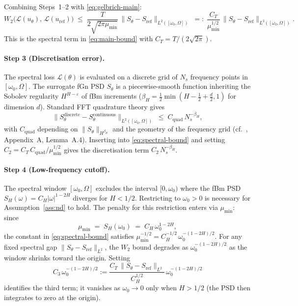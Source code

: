 \documentclass[11pt,a4paper]{article}
\begin{document}
Combining Steps~1--2 with \eqref{eq:gelbrich-main}:
\begin{equation}\label{eq:spectral-bound}
 W_2\!\bigl(\mathcal{L}(u_\theta),\,\mathcal{L}(u_{\mathrm{ref}})\bigr)
 \;\leq\;
 \frac{T}{2\sqrt{2\pi\mu_{\min}}}\,
 \bigl\|S_\theta - S_{\mathrm{ref}}\bigr\|_{L^2([\omega_0,\Omega])}
 \;=:\;
 \frac{C_T}{\mu_{\min}^{1/2}}\,
 \bigl\|S_\theta - S_{\mathrm{ref}}\bigr\|_{L^2([\omega_0,\Omega])}.
\end{equation}
This is the spectral term in \eqref{eq:main-bound} with $C_T = T/(2\sqrt{2\pi})$.

\paragraph{Step 3 (Discretisation error).}
The spectral loss $\mathcal{L}(\theta)$ is evaluated on a discrete grid of
$N_s$ frequency points in $[\omega_0,\Omega]$. The surrogate fGn PSD
$S_\theta$ is a piecewise-smooth function inheriting the Sobolev
regularity $H^{H-\varepsilon}$ of fBm increments ($\beta_H =
\tfrac{1}{2}\min(H-\tfrac{1}{2}+\tfrac{d}{2},1)$ for dimension $d$).
Standard FFT quadrature theory gives
\[
 \bigl\|S_\theta^{\mathrm{discrete}} - S_\theta^{\mathrm{continuous}}
 \bigr\|_{L^2([\omega_0,\Omega])}
 \;\leq\; C_{\mathrm{quad}}\,N_s^{-\beta_H},
\]
with $C_{\mathrm{quad}}$ depending on $\|S_\theta\|_{H^{\beta_H}}$
and the geometry of the frequency grid
(cf.\ \citet{TODO-paper1}, Appendix~A, Lemma~A.4).
Inserting into \eqref{eq:spectral-bound} and setting
$C_2 = C_T\,C_{\mathrm{quad}}/\mu_{\min}^{1/2}$ gives the
discretisation term $C_2\,N_s^{-\beta_H}$.

\paragraph{Step 4 (Low-frequency cutoff).}
The spectral window $[\omega_0,\Omega]$ excludes the interval $[0,\omega_0)$
where the fBm PSD $S_H(\omega) = C_H|\omega|^{1-2H}$ diverges for $H < 1/2$.
Restricting to $\omega_0 > 0$ is necessary for Assumption~\ref{ass:nd} to
hold. The penalty for this restriction enters via $\mu_{\min}$: since
\[
 \mu_{\min} \;=\; S_H(\omega_0) \;=\; C_H\,\omega_0^{1-2H},
\]
the constant in \eqref{eq:spectral-bound} satisfies
$\mu_{\min}^{-1/2} = C_H^{-1/2}\,\omega_0^{-(1-2H)/2}$.
For any fixed spectral gap $\|S_\theta-S_{\mathrm{ref}}\|_{L^2}$, the
$W_2$ bound degrades as $\omega_0^{-(1-2H)/2}$ as the window shrinks toward
the origin. Setting
\[
 C_3\,\omega_0^{-(1-2H)/2}
 := \frac{C_T\,\|S_\theta-S_{\mathrm{ref}}\|_{L^2}}{C_H^{1/2}}\,
   \omega_0^{-(1-2H)/2}
\]
identifies the third term; it vanishes as $\omega_0 \to 0$ only when
$H > 1/2$ (the PSD then integrates to zero at the origin).
\end{document}
